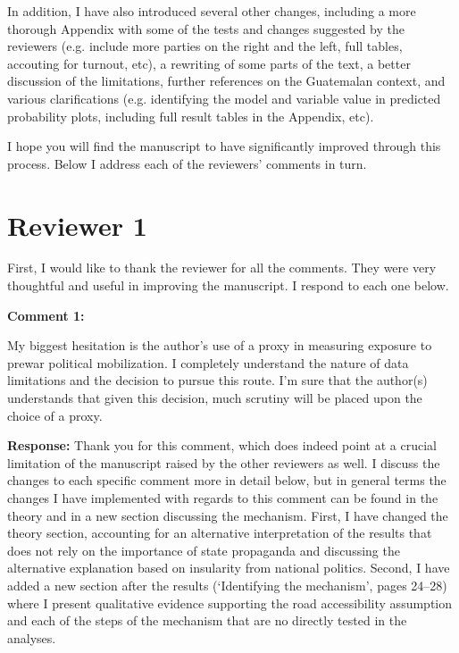 \documentclass[12pt, a4paper, notitlepage]{article}
\begin{document}
In addition, I have also introduced several other changes, including a more thorough Appendix with some of the tests and changes suggested by the reviewers (e.g. include more parties on the right and the left, full tables, accouting for turnout, etc), a rewriting of some parts of the text, a better discussion of the limitations, further references on the Guatemalan context, and various clarifications (e.g. identifying the model and variable value in predicted probability plots, including full result tables in the Appendix, etc).

I hope you will find the manuscript to have significantly improved through this process.
Below I address each of the reviewers' comments in turn.

\newpage
\section*{Reviewer 1}

First, I would like to thank the reviewer for all the comments. They were very thoughtful and useful in improving the manuscript. I respond to each one below.

\vspace{15pt}
\noindent\textbf{Comment 1:}
\begin{displayquote}
My biggest hesitation is the author’s use of a proxy in measuring exposure to prewar political mobilization. I completely understand the nature of data limitations and the decision to pursue this route. I’m sure that the author(s) understands that given this decision, much scrutiny will be placed upon the choice of a proxy.
\end{displayquote}

\noindent\textbf{Response:} Thank you for this comment, which does indeed point at a crucial limitation of the manuscript raised by the other reviewers as well. I discuss the changes to each specific comment more in detail below, but in general terms the changes I have implemented with regards to this comment can be found in the theory and in a new section discussing the mechanism.
First, I have changed the theory section, accounting for an alternative interpretation of the results that does not rely on the importance of state propaganda and discussing the alternative explanation based on insularity from national politics.
Second, I have added a new section after the results (`Identifying the mechanism', pages 24--28) where I present qualitative evidence supporting the road accessibility assumption and each of the steps of the mechanism that are no directly tested in the analyses.
\end{document}
